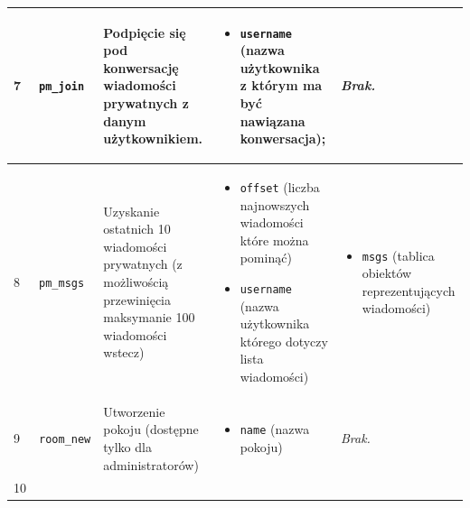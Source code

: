 {\begin{longtable}{ | l | l | l | l | l | }
\hline
\parbox[t]{0.8cm}{
	7

} & \parbox[t]{1.7cm}{\strut
	\texttt{pm\_join}

\strut} & \parbox{4.1cm}{
	Podpięcie się pod konwersację wiadomości
	prywatnych z danym użytkownikiem.

} & \parbox{3.9cm}{
	\begin{itemize}
		\item \texttt{username} (nazwa użytkownika z którym ma być nawiązana konwersacja);
	\end{itemize}


} & \parbox{3.9cm}{
	\textit{Brak.}

} \\

\hline
\parbox[t]{0.8cm}{
	8

} & \parbox[t]{1.7cm}{\strut
	\texttt{pm\_msgs}

\strut} & \parbox{4.1cm}{
	Uzyskanie ostatnich 10 wiadomości prywatnych (z możliwością przewinięcia maksymanie 100 wiadomości wstecz)

} & \parbox{3.9cm}{
	\begin{itemize}
		\item \texttt{offset} (liczba najnowszych wiadomości które można pominąć)
		\item \texttt{username} (nazwa użytkownika którego dotyczy lista wiadomości)
	\end{itemize}


} & \parbox{3.9cm}{
	\begin{itemize}
		\item \texttt{msgs} (tablica obiektów reprezentujących wiadomości)
	\end{itemize}
} \\

\hline

\parbox[t]{0.8cm}{
	9

} & \parbox[t]{1.7cm}{\strut
	\texttt{room\_new}

\strut} & \parbox{4.1cm}{
	Utworzenie pokoju (dostępne tylko dla administratorów)

} & \parbox{3.9cm}{
	\begin{itemize}
		\item \texttt{name} (nazwa pokoju)
	\end{itemize}


} & \parbox{3.9cm}{
	\textit{Brak.}
} \\

\hline

\parbox[t]{0.8cm}{
	10

}
\end{longtable}}
